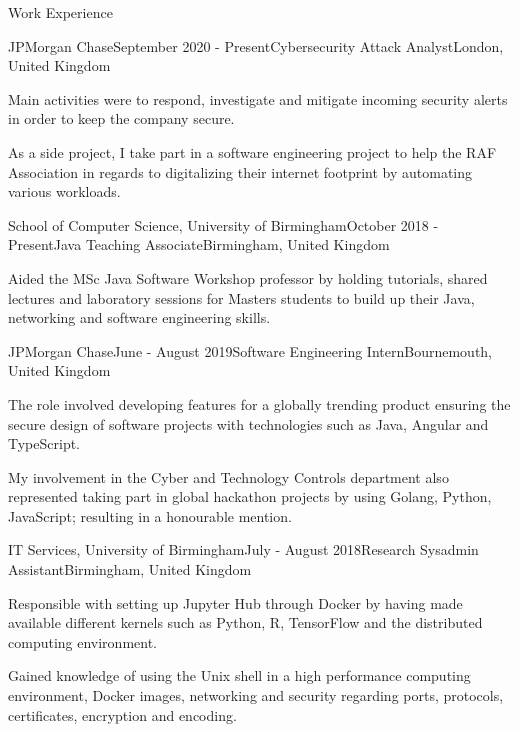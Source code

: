 \documentclass{resume} %
\begin{document}
\begin{rSection}{Work Experience}

\begin{rSubsection}{JPMorgan Chase}{September 2020 - Present}{Cybersecurity Attack Analyst}{London, United Kingdom}
\item Main activities were to respond, investigate and mitigate incoming security alerts in order to keep the company secure.
\item As a side project, I take part in a software engineering project to help the RAF Association in regards to digitalizing their internet footprint by automating various workloads.
\end{rSubsection}

\begin{rSubsection}{School of Computer Science, University of Birmingham}{October 2018 - Present}{Java Teaching Associate}{Birmingham, United Kingdom}
\item Aided the MSc Java Software Workshop professor by holding tutorials, shared lectures and laboratory sessions for Masters students to build up their Java, networking and software engineering skills.
\end{rSubsection}

\begin{rSubsection}{JPMorgan Chase}{June - August 2019}{Software Engineering Intern}{Bournemouth, United Kingdom}
\item The role involved developing features for a globally trending product ensuring the secure design of software projects with technologies such as Java, Angular and TypeScript.
\item My involvement in the Cyber and Technology Controls department also represented taking part in global hackathon projects by using Golang, Python, JavaScript; resulting in a honourable mention.
\end{rSubsection}

\begin{rSubsection}{IT Services, University of Birmingham}{July - August 2018}{Research Sysadmin Assistant}{Birmingham, United Kingdom}
\item Responsible with setting up Jupyter Hub through Docker by having made available different kernels such as Python, R, TensorFlow and the distributed computing environment.
\item Gained knowledge of using the Unix shell in a high performance computing environment, Docker images, networking and security regarding ports, protocols, certificates, encryption and encoding.
\end{rSubsection}


\end{rSection}
\end{document}
